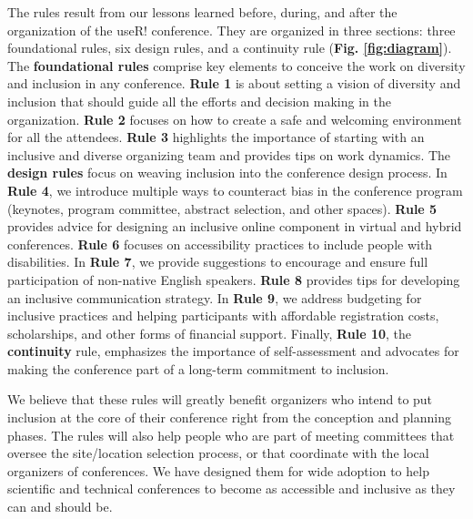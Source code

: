 \documentclass[10pt,letterpaper]{article}
\begin{document}
The rules result from our lessons learned before, during, and after the organization of the useR! conference. 
They are organized in three sections: three foundational rules, six design rules, and a continuity rule (\textbf{Fig. \ref{fig:diagram}}).
The \textbf{foundational rules} comprise key elements to conceive the work on diversity and inclusion in any conference. 
\textbf{Rule 1} is about setting a vision of diversity and inclusion that should guide all the efforts and decision making in the organization.
\textbf{Rule 2} focuses on how to create a safe and welcoming environment for all the attendees. 
\textbf{Rule 3} highlights the importance of starting with an inclusive and diverse organizing team and provides tips on work dynamics.
The \textbf{design rules} focus on weaving inclusion into the conference design process.
In \textbf{Rule 4}, we introduce multiple ways to counteract bias in the conference program (keynotes, program committee, abstract selection, and other spaces). 
\textbf{Rule 5} provides advice for designing an inclusive online component in virtual and hybrid conferences.
\textbf{Rule 6} focuses on accessibility practices to include people with disabilities.
In \textbf{Rule 7}, we provide suggestions to encourage and ensure full participation of non-native English speakers. 
\textbf{Rule 8} provides tips for developing an inclusive communication strategy. 
In \textbf{Rule 9}, we address budgeting for inclusive practices and helping participants with affordable registration costs, scholarships, and other forms of financial support.
Finally, 
\textbf{Rule 10}, the \textbf{continuity} rule, emphasizes the importance of self-assessment and advocates for making the conference part of a long-term commitment to inclusion. 

We believe that these rules will greatly benefit organizers who intend to put inclusion at the core of their conference right from the conception and planning phases.
The rules will also help people who are part of meeting committees that oversee the site/location selection process, or that coordinate with the local organizers of conferences. 
We have designed them for wide adoption to help scientific and technical conferences to become as accessible and inclusive as they can and should be.


\end{document}

